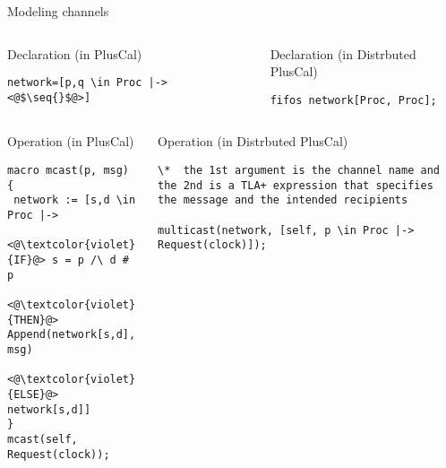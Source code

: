\documentclass{beamer}
\newcommand{\seq}[1]{\langle #1 \rangle}
\begin{document}
\begin{frame}[fragile]{Modeling channels}

\begin{columns}
\begin{column}{0.52\textwidth}
\begin{exampleblock}{Declaration (in PlusCal)}
        \begin{lstlisting}[language=pluscal, frame = none, numbers = none]
network=[p,q \in Proc |-> <@$\seq{}$@>] 
\end{lstlisting}
\end{exampleblock}
\end{column}
\pause

\begin{column}{0.57\textwidth}
\begin{exampleblock}{Declaration (in Distrbuted PlusCal)}
 \begin{lstlisting}[language=pluscal, frame = none, numbers = none]
fifos network[Proc, Proc];\end{lstlisting}
\end{exampleblock}
\end{column}
\pause
\end{columns}

\begin{columns}
\begin{column}{0.5\textwidth}
\begin{exampleblock}{Operation (in PlusCal)}
        \begin{lstlisting}[language=pluscal, frame = none, numbers = none]
macro mcast(p, msg) {
 network := [s,d \in Proc |-> 
 <@\textcolor{violet}{IF}@> s = p /\ d # p 
 <@\textcolor{violet}{THEN}@> Append(network[s,d], msg) 
 <@\textcolor{violet}{ELSE}@> network[s,d]]
}
mcast(self, Request(clock));\end{lstlisting}
\end{exampleblock}
\end{column}
\pause

\begin{column}{0.57\textwidth}
\begin{exampleblock}{Operation (in Distrbuted PlusCal)}
 \begin{lstlisting}[language=pluscal, frame = none, numbers = none]
 \*  the 1st argument is the channel name and the 2nd is a TLA+ expression that specifies the message and the intended recipients
 
multicast(network, [self, p \in Proc |-> Request(clock)]);

\end{lstlisting}
\newline

\end{exampleblock}
\end{column}
\end{columns}
\end{frame}
\end{document}
